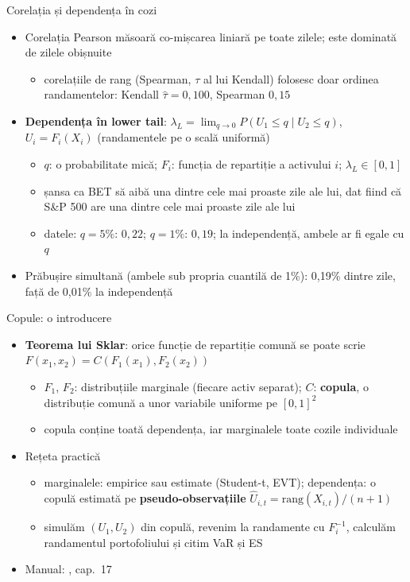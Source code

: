\begin{frame}{Corelația și dependența în cozi}
\itemsize{\small}
\begin{itemize}
    \item Corelația Pearson măsoară co-mișcarea liniară pe toate zilele; este dominată de zilele obișnuite 
    \begin{itemize}
        \item corelațiile de rang (Spearman, $\tau$ al lui Kendall) folosesc doar ordinea randamentelor: Kendall $\hat\tau = 0{,}100$, Spearman $0{,}15$
    \end{itemize}
    \item \textbf{Dependența în lower tail}: $\lambda_L = \lim_{q \to 0} P(U_1 \le q \mid U_2 \le q)$, $U_i = F_i(X_i)$ (randamentele pe o scală uniformă)
    \begin{itemize}
        \item $q$: o probabilitate mică; $F_i$: funcția de repartiție a activului $i$; $\lambda_L \in [0, 1]$
        \item șansa ca BET să aibă una dintre cele mai proaste zile ale lui, dat fiind că S\&P 500 are una dintre cele mai proaste zile ale lui
        \item datele: $q = 5\%$: $0{,}22$; $q = 1\%$: $0{,}19$; la independență, ambele ar fi egale cu $q$
    \end{itemize}
    \item Prăbușire simultană (ambele sub propria cuantilă de 1\%): 0{,}19\% dintre zile, față de 0{,}01\% la independență
\end{itemize}
\end{frame}

\begin{frame}{Copule: o introducere}
\itemsize{\small}
\begin{itemize}
    \item \textbf{Teorema lui Sklar}: orice funcție de repartiție comună se poate scrie $F(x_1, x_2) = C(F_1(x_1), F_2(x_2))$ 
    \begin{itemize}
        \item $F_1$, $F_2$: distribuțiile marginale (fiecare activ separat); $C$: \textbf{copula}, o distribuție comună a unor variabile uniforme pe $[0,1]^2$
        \item copula conține toată dependența, iar marginalele toate cozile individuale
    \end{itemize}
    \item Rețeta practică
    \begin{itemize}
        \item marginalele: empirice sau estimate (Student-t, EVT); dependența: o copulă estimată pe \textbf{pseudo-observațiile} $\hat U_{i,t} = \mathrm{rang}(X_{i,t})/(n + 1)$
        \item simulăm $(U_1, U_2)$ din copulă, revenim la randamente cu $F_i^{-1}$, calculăm randamentul portofoliului și citim VaR și ES
    \end{itemize}
    \item Manual: , cap.~17
\end{itemize}
\end{frame}

